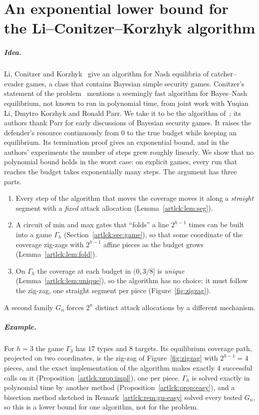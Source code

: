 \chapter{An exponential lower bound for the Li--Conitzer--Korzhyk algorithm}\label{ch:lck}

\paragraph{Idea.} Li, Conitzer and Korzhyk~\cite{lck16} give an algorithm for Nash equilibria of
catcher--evader games, a class that contains Bayesian simple security games. Conitzer's statement of the problem~\cite{conitzer26} mentions a seemingly fast algorithm for Bayes--Nash equilibrium, not known to run in polynomial time, from joint work with Yuqian Li, Dmytro Korzhyk and Ronald Parr. We take it to be the algorithm of~\cite{lck16}; its authors thank Parr for early discussions of Bayesian security games. It raises the defender's
resource continuously from $0$ to the true budget while keeping an equilibrium. Its termination proof gives an exponential bound, and in the authors' experiments the number of steps grew roughly linearly. We show that no polynomial bound holds in the worst case: on explicit games, every run that reaches the budget takes exponentially many steps. The argument has three parts.
\begin{enumerate}[nosep]
\item Every step of the algorithm that moves the coverage moves it along a \emph{straight} segment with a
\emph{fixed} attack allocation (Lemma~\ref{artlck:lem:seg}).
\item A circuit of min and max gates that ``folds'' a line $2^{h-1}$ times can be built into a game
$\Gamma_h$ (Section~\ref{artlck:sec:game}), so that some coordinate of the coverage zig-zags with
$2^{h-1}$ affine pieces as the budget grows (Lemma~\ref{artlck:lem:fold}).
\item On $\Gamma_h$ the coverage at each budget in $(0,3/8]$ is \emph{unique}
(Lemma~\ref{artlck:lem:unique}), so the algorithm has no choice: it must follow the zig-zag, one straight
segment per piece (Figure~\ref{fig:zigzag}).
\end{enumerate}
A second family $G_n$ forces $2^n$ distinct attack allocations by a different mechanism.

\paragraph{Example.} For $h=3$ the game $\Gamma_3$ has $17$ types and $8$ targets. Its equilibrium
coverage path, projected on two coordinates, is the zig-zag of Figure~\ref{fig:zigzag} with
$2^{h-1}=4$ pieces, and the exact implementation of the algorithm makes exactly $4$ successful calls on it
(Proposition~\ref{artlck:prop:impl}), one per piece. $\Gamma_h$ is solved exactly in polynomial time by another method (Proposition~\ref{artlck:prop:easy}), and a bisection method sketched in Remark~\ref{artlck:rem:gn-easy} solved every tested $G_n$, so this is a lower bound for one algorithm, not for
the problem.


